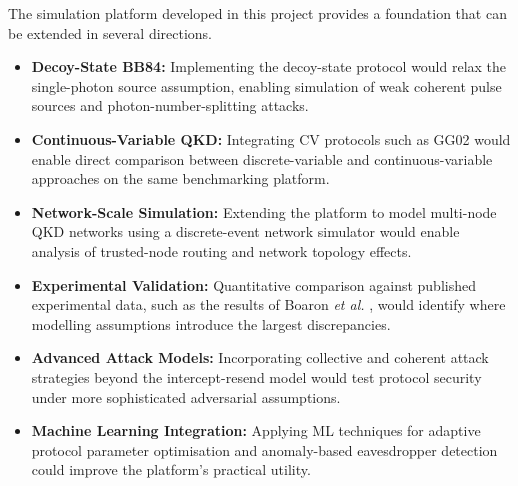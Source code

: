 \documentclass[10pt, a4paper]{report}
\renewcommand{\footnotesize}{\fontsize{8}{9}\selectfont}
\begin{document}
The simulation platform developed in this project provides a foundation that can be extended in several directions.

\begin{itemize}
    \item \textbf{Decoy-State BB84:} Implementing the decoy-state protocol \cite{Lo2005Decoy} would relax the single-photon source assumption, enabling simulation of weak coherent pulse sources and photon-number-splitting attacks. %

    \item \textbf{Continuous-Variable QKD:} Integrating CV protocols such as GG02 would enable direct comparison between discrete-variable and continuous-variable approaches on the same benchmarking platform. %

    \item \textbf{Network-Scale Simulation:} Extending the platform to model multi-node QKD networks using a discrete-event network simulator would enable analysis of trusted-node routing and network topology effects. %

    \item \textbf{Experimental Validation:} Quantitative comparison against published experimental data, such as the results of Boaron \textit{et al.} \cite{Boaron2018}, would identify where modelling assumptions introduce the largest discrepancies. %

    \item \textbf{Advanced Attack Models:} Incorporating collective and coherent attack strategies beyond the intercept-resend model would test protocol security under more sophisticated adversarial assumptions. %

    \item \textbf{Machine Learning Integration:} Applying ML techniques for adaptive protocol parameter optimisation and anomaly-based eavesdropper detection could improve the platform's practical utility. %
\end{itemize}



\clearpage
{\footnotesize


}
\end{document}
